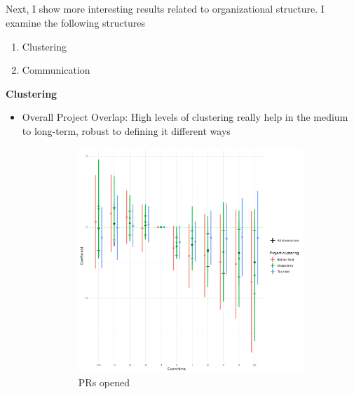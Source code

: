 \documentclass[12pt,notitlepage]{article}
\begin{document}
\subsection{}
Next, I show more interesting results related to organizational structure. I examine the following structures
\begin{enumerate}
    \item Clustering
    \item Communication
\end{enumerate}

\textbf{Clustering}
\begin{itemize}
    \item Overall Project Overlap: High levels of clustering really help in the medium to long-term, robust to defining it different ways

\begin{figure}[htbp]
  \centering
  \begin{subfigure}[b]{0.32\textwidth}
    \centering
    \includegraphics[width=\textwidth]{temp/project_clus_combined_2p_back_bin_third.png}
    \caption{PRs opened}
    \label{fig:clustering_outcome}
  \end{subfigure}\hfill
  \begin{subfigure}[b]{0.32\textwidth}
    \centering

\end{subfigure}
\end{figure}
\end{itemize}
\end{document}

